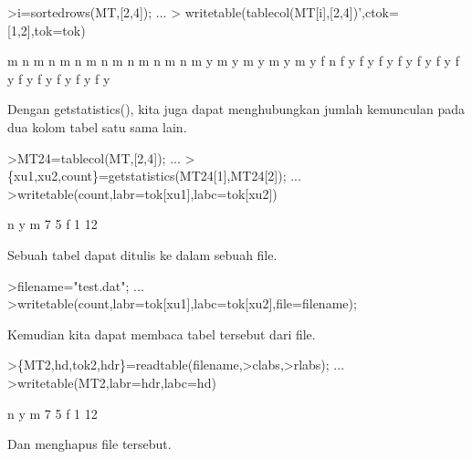 \documentclass{article}
\newenvironment{eulernotebook}{\par}{\par}
\newenvironment{eulercomment}{\par\medskip}{\par\medskip}
\begin{document}
\begin{eulernotebook}
\begin{eulerprompt}
>i=sortedrows(MT,[2,4]);  ...
>  writetable(tablecol(MT[i],[2,4])',ctok=[1,2],tok=tok)
\end{eulerprompt}
\begin{euleroutput}
           m         n
           m         n
           m         n
           m         n
           m         n
           m         n
           m         n
           m         y
           m         y
           m         y
           m         y
           m         y
           f         n
           f         y
           f         y
           f         y
           f         y
           f         y
           f         y
           f         y
           f         y
           f         y
           f         y
           f         y
           f         y
\end{euleroutput}
\begin{eulercomment}
Dengan getstatistics(), kita juga dapat menghubungkan jumlah
kemunculan pada dua kolom tabel satu sama lain.
\end{eulercomment}
\begin{eulerprompt}
>MT24=tablecol(MT,[2,4]); ...
>\{xu1,xu2,count\}=getstatistics(MT24[1],MT24[2]); ...
>writetable(count,labr=tok[xu1],labc=tok[xu2])
\end{eulerprompt}
\begin{euleroutput}
                     n         y
           m         7         5
           f         1        12
\end{euleroutput}
\begin{eulercomment}
Sebuah tabel dapat ditulis ke dalam sebuah file.
\end{eulercomment}
\begin{eulerprompt}
>filename="test.dat"; ...
>writetable(count,labr=tok[xu1],labc=tok[xu2],file=filename);
\end{eulerprompt}
\begin{eulercomment}
Kemudian kita dapat membaca tabel tersebut dari file.
\end{eulercomment}
\begin{eulerprompt}
>\{MT2,hd,tok2,hdr\}=readtable(filename,>clabs,>rlabs); ...
>writetable(MT2,labr=hdr,labc=hd)
\end{eulerprompt}
\begin{euleroutput}
                     n         y
           m         7         5
           f         1        12
\end{euleroutput}
\begin{eulercomment}
Dan menghapus file tersebut.

\end{eulercomment}
\end{eulernotebook}
\end{document}
